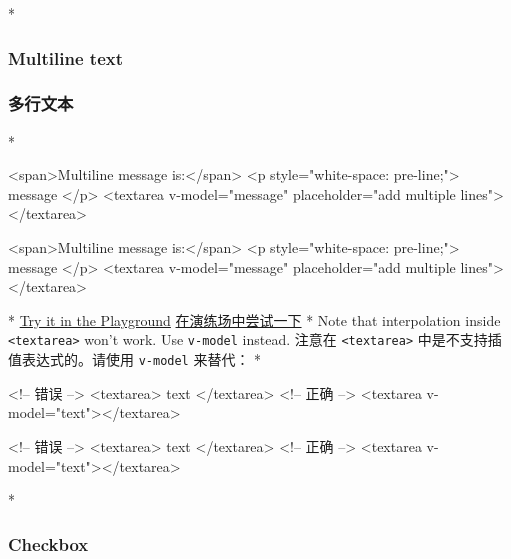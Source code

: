 \begin{paracol}{2}

\switchcolumn[0]*%
\subsubsection{Multiline text}
\switchcolumn
\subsubsection{多行文本}
\switchcolumn[0]*%
\begin{codeHtml}
<span>Multiline message is:</span>
<p style="white-space: pre-line;">{{ message }}</p>
<textarea v-model="message" placeholder="add multiple lines"></textarea>
\end{codeHtml}
\switchcolumn
\begin{codeHtml}
<span>Multiline message is:</span>
<p style="white-space: pre-line;">{{ message }}</p>
<textarea v-model="message" placeholder="add multiple lines"></textarea>
\end{codeHtml}
\switchcolumn[0]*%
\href{https://play.vuejs.org/\#eNo9jktuwzAMRK9CaON24XrvKgZ6gN5AG8FmGgH6ECKdJjB891D5LYec9zCb+SH6Oq9oRmN5roEEGGWlyeWQqFSBDSoeYYdjLQk6rXYuuzyXzAIJmf0fwqF1Prru02U7PDQq0CCYKHrBlsQy+Tz9rlFCDBnfdOBRqfa7twhYrhEPzvyfgmCvnxlHoIp9w76dmbbtDe+7HdpaBQUv4it6OPepLBjV8Gw5AzpjxlOJC1a9+2WB1IZQRGhWVqsdXgb1tfDcbvYbJDRqLQ==}{Try
it in the Playground}
\switchcolumn
\href{https://play.vuejs.org/\#eNo9jktuwzAMRK9CaON24XrvKgZ6gN5AG8FmGgH6ECKdJjB891D5LYec9zCb+SH6Oq9oRmN5roEEGGWlyeWQqFSBDSoeYYdjLQk6rXYuuzyXzAIJmf0fwqF1Prru02U7PDQq0CCYKHrBlsQy+Tz9rlFCDBnfdOBRqfa7twhYrhEPzvyfgmCvnxlHoIp9w76dmbbtDe+7HdpaBQUv4it6OPepLBjV8Gw5AzpjxlOJC1a9+2WB1IZQRGhWVqsdXgb1tfDcbvYbJDRqLQ==}{在演练场中尝试一下}
\switchcolumn[0]*%
Note that interpolation inside
\texttt{\textless{}textarea\textgreater{}} won't work. Use
\texttt{v-model} instead.
\switchcolumn
注意在 \texttt{\textless{}textarea\textgreater{}}
中是不支持插值表达式的。请使用 \texttt{v-model} 来替代：
\switchcolumn[0]*%
\begin{codeHtml}
<!-- 错误 -->
<textarea>{{ text }}</textarea>
<!-- 正确 -->
<textarea v-model="text"></textarea>
\end{codeHtml}
\switchcolumn
\begin{codeHtml}
<!-- 错误 -->
<textarea>{{ text }}</textarea>
<!-- 正确 -->
<textarea v-model="text"></textarea>
\end{codeHtml}


\switchcolumn[0]*%
\subsubsection{Checkbox}
\switchcolumn

\end{paracol}
